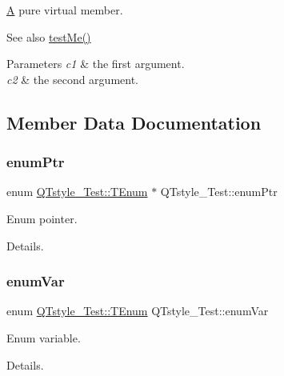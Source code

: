 \mbox{\hyperlink{class_a}{A}} pure virtual member. 

\begin{DoxySeeAlso}{See also}
\mbox{\hyperlink{class_q_tstyle___test_a8840748753118dd468e8368a28e49c62}{test\+Me()}} 
\end{DoxySeeAlso}

\begin{DoxyParams}{Parameters}
{\em c1} & the first argument. \\
\hline
{\em c2} & the second argument. \\
\hline
\end{DoxyParams}


\subsection{Member Data Documentation}
\mbox{\label{class_q_tstyle___test_a973a4566c9a036f4eca508ba5fe80dcb}} 
\subsubsection{\texorpdfstring{enumPtr}{enumPtr}}
{\footnotesize\ttfamily enum \mbox{\hyperlink{class_q_tstyle___test_a0525f798cda415a94fedeceb806d2c49}{Q\+Tstyle\+\_\+\+Test\+::\+T\+Enum}}
         $\ast$ Q\+Tstyle\+\_\+\+Test\+::enum\+Ptr}



Enum pointer. 

Details. \mbox{\label{class_q_tstyle___test_adb265d815b43f1f7f0de0e8b8852a5d0}} 
\subsubsection{\texorpdfstring{enumVar}{enumVar}}
{\footnotesize\ttfamily enum \mbox{\hyperlink{class_q_tstyle___test_a0525f798cda415a94fedeceb806d2c49}{Q\+Tstyle\+\_\+\+Test\+::\+T\+Enum}}
          Q\+Tstyle\+\_\+\+Test\+::enum\+Var}



Enum variable. 

Details. \mbox{\label{class_q_tstyle___test_a79dd4e5498f09057775a819d911349e2}} 
